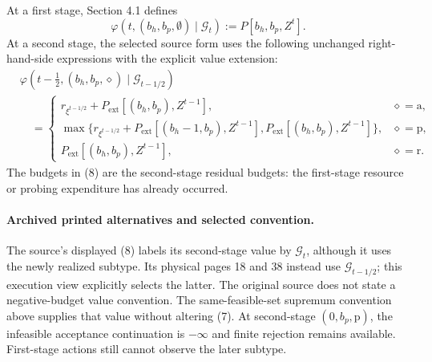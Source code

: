\documentclass{article}
\begin{document}
At a first stage, Section 4.1 defines
\[
\varphi(t,(b_h,b_p,\emptyset)\mid\mathcal G_t)
:=P[b_h,b_p,Z^t].
\]
At a second stage, the selected source form uses the following unchanged right-hand-side expressions with the explicit value extension:
\begin{equation}
\begin{aligned}
&\varphi(t-\tfrac12,(b_h,b_p,\diamond)\mid\mathcal G_{t-1/2})\\
&\quad=\begin{cases}
r_{\xi^{t-1/2}}+P_{\mathrm{ext}}[(b_h,b_p),Z^{t-1}],
 &\diamond=\mathrm a,\\[2pt]
\max\{r_{\xi^{t-1/2}}+P_{\mathrm{ext}}[(b_h-1,b_p),Z^{t-1}],
       P_{\mathrm{ext}}[(b_h,b_p),Z^{t-1}]\},
 &\diamond=\mathrm p,\\[2pt]
P_{\mathrm{ext}}[(b_h,b_p),Z^{t-1}],
 &\diamond=\mathrm r.
\end{cases}
\end{aligned}\tag{8}
\end{equation}
The budgets in (8) are the second-stage residual budgets: the first-stage resource or probing expenditure has already occurred.

\paragraph{Archived printed alternatives and selected convention.}
The source's displayed (8) labels its second-stage value by $\mathcal G_t$, although it uses the newly realized subtype. Its physical pages 18 and 38 instead use $\mathcal G_{t-1/2}$; this execution view explicitly selects the latter. The original source does not state a negative-budget value convention. The same-feasible-set supremum convention above supplies that value without altering (7). At second-stage $(0,b_p,\mathrm p)$, the infeasible acceptance continuation is $-\infty$ and finite rejection remains available. First-stage actions still cannot observe the later subtype.
\end{document}
